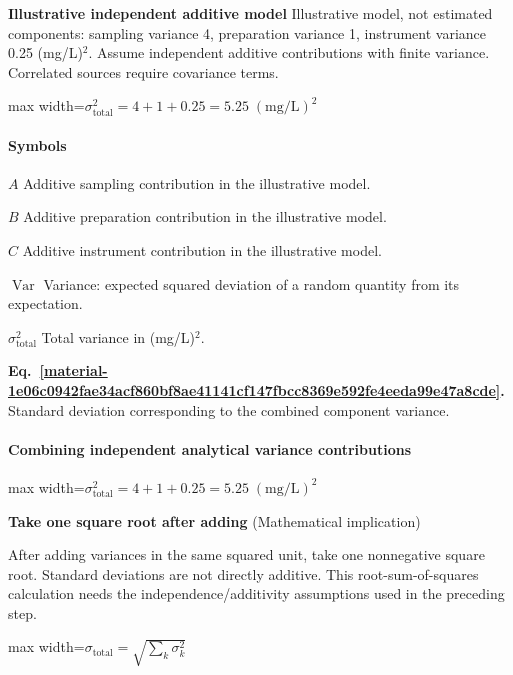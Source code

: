 \documentclass[11pt,a4paper]{article}
\begin{document}
\par\textbf{Illustrative independent additive model} Illustrative model, not estimated components: sampling variance 4, preparation variance 1, instrument variance 0.25 (mg/L)\ensuremath{{}^2}. Assume independent additive contributions with finite variance. Correlated sources require covariance terms.
\begin{center}\begin{adjustbox}{max width=\linewidth}$\displaystyle \sigma_{\mathrm{total}}^2=4+1+0.25=5.25\;(\mathrm{mg/L})^2$\end{adjustbox}\end{center}

\paragraph{Symbols}
\par\noindent\textbf{\(A\)} Additive sampling contribution in the illustrative model.
\par\noindent\textbf{\(B\)} Additive preparation contribution in the illustrative model.
\par\noindent\textbf{\(C\)} Additive instrument contribution in the illustrative model.
\par\noindent\textbf{\(\operatorname{Var}\)} Variance: expected squared deviation of a random quantity from its expectation.
\par\noindent\textbf{\(\sigma_{\mathrm{total}}^2\)} Total variance in (mg/L)\ensuremath{{}^2}.
\medskip

\par\medskip
{}
\label{material-1e06c0942fae34acf860bf8ae41141cf147fbcc8369e592fe4eeda99e47a8cde}
\noindent\textbf{Eq.~\ref*{material-1e06c0942fae34acf860bf8ae41141cf147fbcc8369e592fe4eeda99e47a8cde}.} Standard deviation corresponding to the combined component variance.\par\nopagebreak
\paragraph{Combining independent analytical variance contributions}
\begin{center}\begin{adjustbox}{max width=\linewidth}$\displaystyle \sigma_{\mathrm{total}}^2=4+1+0.25=5.25\;(\mathrm{mg/L})^2$\end{adjustbox}\end{center}
\noindent\textbf{Take one square root after adding} (Mathematical implication)\par
After adding variances in the same squared unit, take one nonnegative square root. Standard deviations are not directly additive. This root-sum-of-squares calculation needs the independence/additivity assumptions used in the preceding step.
\begin{center}\begin{adjustbox}{max width=\linewidth}$\displaystyle \sigma_{\mathrm{total}}=\sqrt{\sum_k\sigma_k^2}$\end{adjustbox}\end{center}
\end{document}
